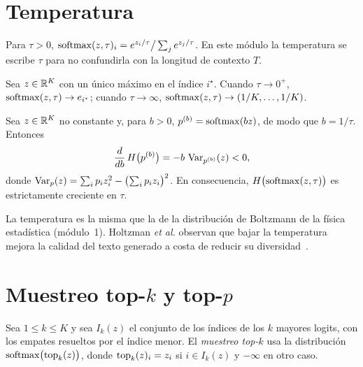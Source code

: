 \section{Temperatura}

\begin{definicion}\label{def:temperatura}
Para $\tau>0$, $\operatorname{softmax}(z,\tau)_i=e^{z_i/\tau}\big/\sum_j e^{z_j/\tau}$. En este módulo la temperatura se escribe $\tau$ para no confundirla con la longitud de contexto $T$.
\end{definicion}

\begin{proposicion}[Límites]\label{prop:limites}
Sea $z\in\mathbb{R}^{K}$ con un único máximo en el índice $i^{\star}$. Cuando $\tau\to 0^{+}$, $\operatorname{softmax}(z,\tau)\to e_{i^{\star}}$; cuando $\tau\to\infty$, $\operatorname{softmax}(z,\tau)\to(1/K,\dots,1/K)$.
\end{proposicion}

\begin{teorema}\label{teo:entropia-tau}
Sea $z\in\mathbb{R}^{K}$ no constante y, para $b>0$, $p^{(b)}=\operatorname{softmax}(bz)$, de modo que $b=1/\tau$. Entonces
\[
\frac{d}{db}\,H\bigl(p^{(b)}\bigr)=-b\,\operatorname{Var}_{p^{(b)}}(z)<0,
\]
donde $\operatorname{Var}_{p}(z)=\sum_i p_iz_i^{2}-\bigl(\sum_i p_iz_i\bigr)^{2}$. En consecuencia, $H\bigl(\operatorname{softmax}(z,\tau)\bigr)$ es estrictamente creciente en $\tau$.
\end{teorema}

\addtocounter{definicion}{1}%

La temperatura es la misma que la de la distribución de Boltzmann de la física estadística (módulo~1). Holtzman \emph{et al.} observan que bajar la temperatura mejora la calidad del texto generado a costa de reducir su diversidad~\cite[§3.3]{holtzman}.

\section{Muestreo top-\texorpdfstring{$k$}{k} y top-\texorpdfstring{$p$}{p}}

\begin{definicion}[Top-$k$]\label{def:topk}
Sea $1\le k\le K$ y sea $I_k(z)$ el conjunto de los índices de los $k$ mayores logits, con los empates resueltos por el índice menor. El \emph{muestreo top-$k$} usa la distribución $\operatorname{softmax}\bigl(\operatorname{top}_k(z)\bigr)$, donde $\operatorname{top}_k(z)_i=z_i$ si $i\in I_k(z)$ y $-\infty$ en otro caso.
\end{definicion}

